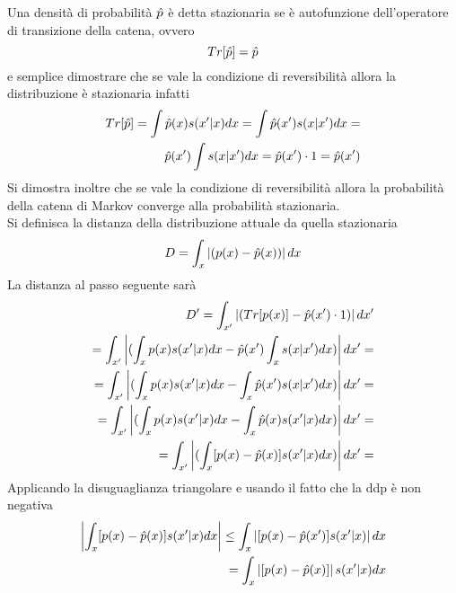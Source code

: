 Una  densità   di probabilità   $\hat{p}$ è   detta stazionaria se è   autofunzione
dell’operatore di transizione della catena, ovvero\\
\begin{equation}
Tr[\hat{p}]=\hat{p}
\end{equation}
e semplice dimostrare che se vale la condizione di reversibilità   allora la distribuzione
è   stazionaria infatti
\begin{equation*}
\begin{split}
Tr[\hat{p}]=\int \hat{p}(x)s(x'|x)dx=\int \hat{p}(x')s(x|x')dx=\\
\hat{p}(x')\int s(x|x')dx=\hat{p}(x')\cdot 1=\hat{p}(x')
\end{split}
\end{equation*}
Si dimostra inoltre che se vale la condizione di reversibilità allora la probabilità della catena di Markov converge alla probabilità stazionaria.\\
Si definisca la distanza della distribuzione attuale da quella stazionaria\\
\begin{equation}
D=\int_x \left\vert (p(x) - \hat{p}(x))\right\vert dx 
\end{equation}
La distanza al passo seguente sarà
\begin{equation}
\begin{split}
D'=\int_{x'} \left\vert (Tr[p(x)] - \hat{p}(x')\cdot 1) \right\vert dx'\\
=\int_{x'} \left\vert (\int_{x}p(x)s(x'|x)dx - \hat{p}(x')\int_{x}s(x|x')dx) \right\vert dx'=\\
=\int_{x'} \left\vert(\int_{x}p(x)s(x'|x)dx  - \int_{x}\hat{p}(x')s(x|x')dx) \right\vert dx'=\\
=\int_{x'} \left\vert(\int_{x}p(x)s(x'|x)dx  - \int_{x}\hat{p}(x)s(x'|x)dx) \right\vert dx'=\\
=\int_{x'} \left\vert (\int_{x}[p(x)-\hat{p}(x)]s(x'|x)dx ) \right\vert dx'=\\
\end{split}
\end{equation}
Applicando la disuguaglianza triangolare  e usando il fatto che la ddp è non negativa
\begin{equation}
\begin{split}
 \left\vert \int_{x}[p(x)-\hat{p}(x)]s(x'|x )dx \right\vert \leq    \int_{x}\left\vert[p(x)-\hat{p}(x')]s(x'|x)\right\vert dx \\
 =\int_{x} \left\vert[p(x)-\hat{p}(x)]\right\vert   s(x'|x)dx \\
\end{split}
\end{equation}

